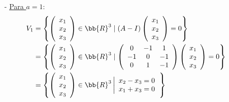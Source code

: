 \begin{ejercicio}
\begin{enumerate}
\begin{itemize}
        \item[-] \underline{Para $a=1$}:
        \begin{equation*}\begin{split}
               V_{1} & = \left\{ \left(\begin{array}{c}
                    x_1 \\
                    x_2 \\
                    x_3
               \end{array}\right) \in \bb{R}^3 \mid (A-I)\left(\begin{array}{c}
                    x_1 \\
                    x_2 \\
                    x_3
               \end{array}\right) = 0 \right\} \\
               & = \left\{ \left(\begin{array}{c}
                    x_1 \\
                    x_2 \\
                    x_3
               \end{array}\right) \in \bb{R}^3 \mid \left( \begin{array}{ccc}
                0 & -1 & 1 \\
                -1 & 0 & -1 \\
                0 & 1 & -1
            \end{array}\right) \left(\begin{array}{c}
                    x_1 \\
                    x_2 \\
                    x_3
               \end{array}\right) = 0 \right\} \\
               & = \left\{ \left(\begin{array}{c}
                    x_1 \\
                    x_2  \\
                    x_3
               \end{array}\right) \in \bb{R}^3 \left| \begin{array}{c}
                    x_2-x_3=0 \\
                    x_1+x_3=0
               \end{array}\right. \right\}
       \end{split}\end{equation*}
        \begin{table}[H]

\end{table}
\end{itemize}
\end{enumerate}
\end{ejercicio}
